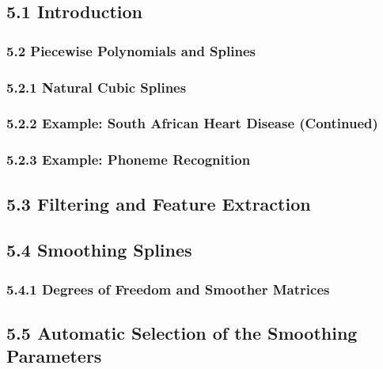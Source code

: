 \documentclass[11pt]{article}
\begin{document}
\subsection{5.1 Introduction}\label{introduction}

\subsubsection{5.2 Piecewise Polynomials and
Splines}\label{piecewise-polynomials-and-splines}

\subsubsection{5.2.1 Natural Cubic Splines}\label{natural-cubic-splines}

\subsubsection{5.2.2 Example: South African Heart Disease
(Continued)}\label{example-south-african-heart-disease-continued}

\subsubsection{5.2.3 Example: Phoneme
Recognition}\label{example-phoneme-recognition}

\subsection{5.3 Filtering and Feature
Extraction}\label{filtering-and-feature-extraction}

\subsection{5.4 Smoothing Splines}\label{smoothing-splines}

\subsubsection{5.4.1 Degrees of Freedom and Smoother
Matrices}\label{degrees-of-freedom-and-smoother-matrices}

\subsection{5.5 Automatic Selection of the Smoothing
Parameters}\label{automatic-selection-of-the-smoothing-parameters}
\end{document}
